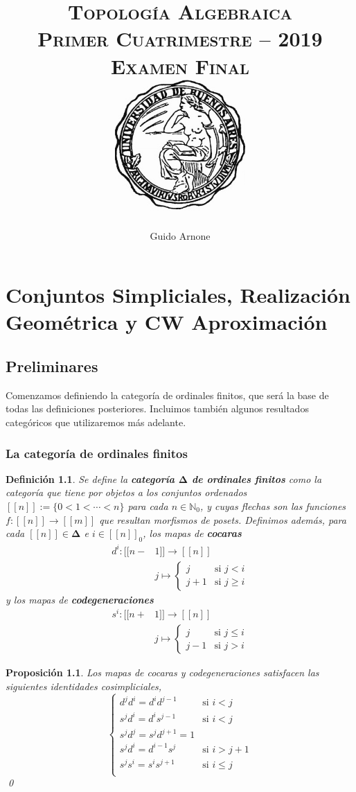 \documentclass[11pt]{report}
\title{
\scshape\Huge{Topología Algebraica}
\\
\vspace{3pt}
\Large{Primer Cuatrimestre -- 2019}
\\
\vspace{0.5pt}
\Large{Examen Final}
\\
\vspace{80pt}
{\includegraphics[height=5cm]{uba2.jpg}}
\vspace{80pt}
}
\author{\Large Guido Arnone}
\date{}
\theoremstyle{colored}
\newtheorem{definition}{Definición}[section]
\newtheorem{proposition}{Proposición}[section]
\newcommand{\N}{\mathbb{N}}
\newcommand{\nat}[1]{[\![#1]\!]}
\newcommand{\ord}[1]{\nat{#1}}
\newcommand{\natzero}[1]{\nat{#1}_0}
\newcommand{\ordcat}{\boldsymbol{\Delta}}
\begin{document}
\maketitle
\renewcommand{\contentsname}{Índice}
\tableofcontents
\chapter{Conjuntos Simpliciales, Realización Geométrica y CW Aproximación}

\section{Preliminares}

Comenzamos definiendo la categoría de ordinales finitos, que será la base de todas las definiciones posteriores. Incluimos también algunos resultados categóricos que utilizaremos más adelante.

\subsection{La categoría de ordinales finitos}

\begin{definition} Se define la \textbf{categoría $\ordcat$ de ordinales finitos} como la categoría que tiene por objetos a los conjuntos ordenados $\ord{n} := \{0 < 1 < \cdots < n\}$ para cada $n \in \N_0$, y cuyas flechas son las funciones $f : \ord{n} \to \ord{m}$ que resultan morfismos de posets. Definimos además, para cada $\ord{n} \in \ordcat$ e $i \in \natzero{n}$, los mapas de \textbf{cocaras} 
\begin{align*}
d^i : \ord{n-&1} \to \ord{n}\\
&j \mapsto \begin{cases}
j &\text{si $j < i$}\\
j+1 &\text{si $j \geq i$}
\end{cases}
\end{align*}
y los mapas de \textbf{codegeneraciones}
\begin{align*}
s^i : \ord{n+&1} \to \ord{n}\\
&j \mapsto \begin{cases}
j &\text{si $j \leq i$}\\
j-1 &\text{si $j > i$}
\end{cases}
\end{align*}
\end{definition}

\begin{proposition} Los mapas de cocaras y codegeneraciones satisfacen las siguientes \textit{identidades cosimpliciales},
\[
\begin{cases}
d^jd^i = d^id^{j-1} &\text{si $i < j$}\\
s^jd^i = d^is^{j-1} &\text{si $i < j$}\\
s^jd^j = s^jd^{j+1} = 1\\
s^jd^i = d^{i-1}s^j &\text{si $i > j+1$}\\
s^js^i = s^is^{j+1} &\text{si $i \leq j$}\\
\end{cases}
\]
\qed \\
\end{proposition}
\end{document}
